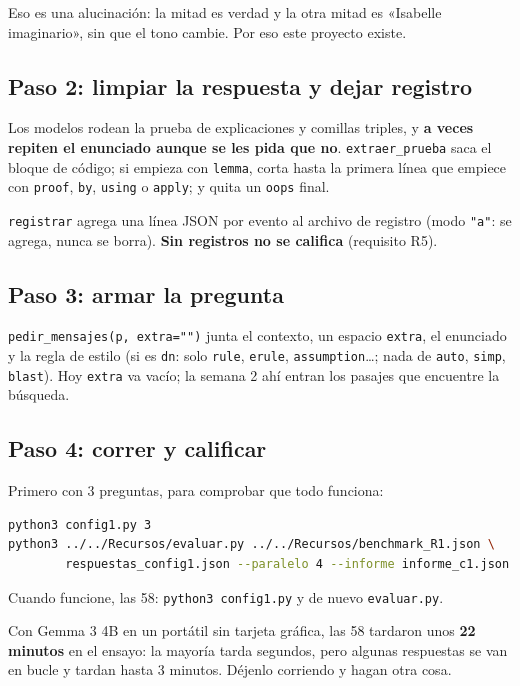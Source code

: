 \documentclass[11pt,a4paper]{article}
\newcommand{\cd}[1]{\texttt{\small #1}}
\begin{document}
\begin{ojo}
  Eso es una alucinación: la mitad es verdad y la otra mitad es
  «Isabelle imaginario», sin que el tono cambie. Por eso este proyecto
  existe.
\end{ojo}

\subsection{Paso 2: limpiar la respuesta y dejar registro}
Los modelos rodean la prueba de explicaciones y comillas triples, y
\textbf{a veces repiten el enunciado aunque se les pida que no}.
\cd{extraer\_prueba} saca el bloque de código; si empieza con
\cd{lemma}, corta hasta la primera línea que empiece con \cd{proof},
\cd{by}, \cd{using} o \cd{apply}; y quita un \cd{oops} final.

\cd{registrar} agrega una línea JSON por evento al archivo de registro
(modo \cd{"a"}: se agrega, nunca se borra). \textbf{Sin registros no se
califica} (requisito R5).

\subsection{Paso 3: armar la pregunta}
\cd{pedir\_mensajes(p, extra="")} junta el contexto, un espacio
\cd{extra}, el enunciado y la regla de estilo (si es \cd{dn}: solo
\cd{rule}, \cd{erule}, \cd{assumption}\ldots; nada de \cd{auto},
\cd{simp}, \cd{blast}). Hoy \cd{extra} va vacío; la semana 2 ahí entran
los pasajes que encuentre la búsqueda.

\subsection{Paso 4: correr y calificar}
\begin{haga}
Primero con 3 preguntas, para comprobar que todo funciona:
\begin{lstlisting}[language=bash]
python3 config1.py 3
python3 ../../Recursos/evaluar.py ../../Recursos/benchmark_R1.json \
        respuestas_config1.json --paralelo 4 --informe informe_c1.json
\end{lstlisting}
Cuando funcione, las 58: \cd{python3 config1.py} y de nuevo
\cd{evaluar.py}.
\end{haga}
\begin{ojo}
  Con Gemma 3 4B en un portátil sin tarjeta gráfica, las 58 tardaron unos
  \textbf{22 minutos} en el ensayo: la mayoría tarda segundos, pero
  algunas respuestas se van en bucle y tardan hasta 3 minutos. Déjenlo
  corriendo y hagan otra cosa.
\end{ojo}
\end{document}
